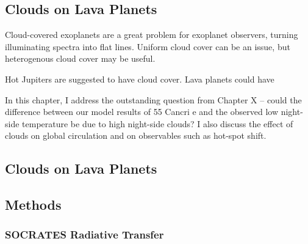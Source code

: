 \begin{SingleSpace}
\chapter{Clouds on Lava Planets}
\vspace{0.5cm}
\end{SingleSpace}
\vspace{0.5cm}






Cloud-covered exoplanets are a great problem for exoplanet observers, turning illuminating spectra into flat lines. Uniform cloud cover can be an issue, but heterogenous cloud cover may be useful.



Hot Jupiters are suggested to have cloud cover. Lava planets could have



In this chapter, I address the outstanding question from Chapter X -- could the difference between our model results of 55 Cancri e and the observed low night-side temperature be due to high night-side clouds? I also discuss the effect of clouds on global circulation and on observables such as hot-spot shift.


\section{Clouds on Lava Planets}






\section{Methods}


\subsection{SOCRATES Radiative Transfer}

